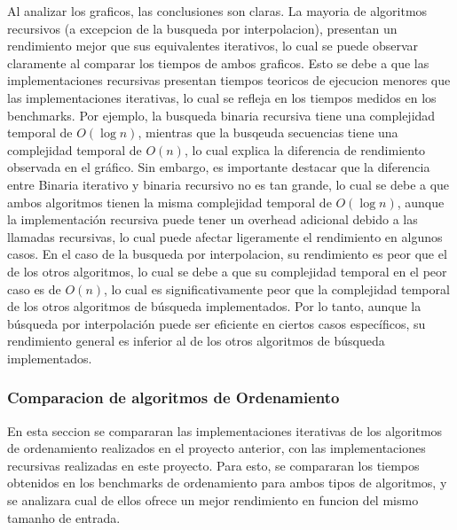 Al analizar los graficos, las conclusiones son claras. La mayoria de algoritmos recursivos (a excepcion de la busqueda por interpolacion), presentan un rendimiento mejor que sus equivalentes iterativos, lo cual se puede observar claramente al comparar los tiempos de ambos graficos.  Esto se debe a que las implementaciones recursivas presentan tiempos teoricos de ejecucion menores que las implementaciones iterativas, lo cual se refleja en los tiempos medidos en los benchmarks.  Por ejemplo, la busqueda binaria recursiva tiene una complejidad temporal de $O(\log n)$, mientras que la busqeuda secuencias tiene una complejidad temporal de $O(n)$, lo cual explica la diferencia de rendimiento observada en el gráfico.  Sin embargo, es importante destacar que la diferencia entre Binaria iterativo y binaria recursivo no es tan grande, lo cual se debe a que ambos algoritmos tienen la misma complejidad temporal de $O(\log n)$, aunque la implementación recursiva puede tener un overhead adicional debido a las llamadas recursivas, lo cual puede afectar ligeramente el rendimiento en algunos casos.  En el caso de la busqueda por interpolacion, su rendimiento es peor que el de los otros algoritmos, lo cual se debe a que su complejidad temporal en el peor caso es de $O(n)$, lo cual es significativamente peor que la complejidad temporal de los otros algoritmos de búsqueda implementados.  Por lo tanto, aunque la búsqueda por interpolación puede ser eficiente en ciertos casos específicos, su rendimiento general es inferior al de los otros algoritmos de búsqueda implementados.


\subsubsection{Comparacion de algoritmos de Ordenamiento}

En esta seccion se compararan las implementaciones iterativas de los algoritmos de ordenamiento realizados en el proyecto anterior, con las implementaciones recursivas realizadas en este proyecto.  Para esto, se compararan los tiempos obtenidos en los benchmarks de ordenamiento para ambos tipos de algoritmos, y se analizara cual de ellos ofrece un mejor rendimiento en funcion del mismo tamanho de entrada. \\

